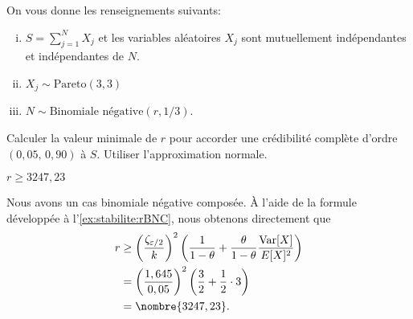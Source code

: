 \begin{exercice}
  On vous donne les renseignements suivants:
  \begin{enumerate}[(i)]
  \item $S = \sum_{j=1}^{N} X_j$ et les variables aléatoires
    $X_j$ sont mutuellement indépendantes et indépendantes de $N$.
  \item $X_j \sim \text{Pareto}(3, 3)$
  \item $N \sim \text{Binomiale négative}(r, 1/3)$.
  \end{enumerate}
  Calculer la valeur minimale de $r$ pour accorder une crédibilité
  complète d'ordre $(0,05,\, 0,90)$ à $S$. Utiliser l'approximation
  normale.
  \begin{rep}
    $r \geq 3247,23$
  \end{rep}
  \begin{sol}
    Nous avons un cas binomiale négative composée. À l'aide de la
    formule développée à l'\autoref{ex:stabilite:rBNC}, nous obtenons
    directement que
    \begin{align*}
      r
      &\geq
      \left(
        \frac{\zeta_{\varepsilon/2}}{k}
      \right)^2
      \left(
        \frac{1}{1 - \theta} +
        \frac{\theta}{1-\theta} \frac{\var{X}}{\esp{X}^2}
      \right) \\
      &=
      \left(
        \frac{1,645}{0,05}
      \right)^2
      \left(
        \frac{3}{2} + \frac{1}{2} \cdot 3
      \right) \\
      &= \nombre{3247,23}.
    \end{align*}
  \end{sol}
\end{exercice}


